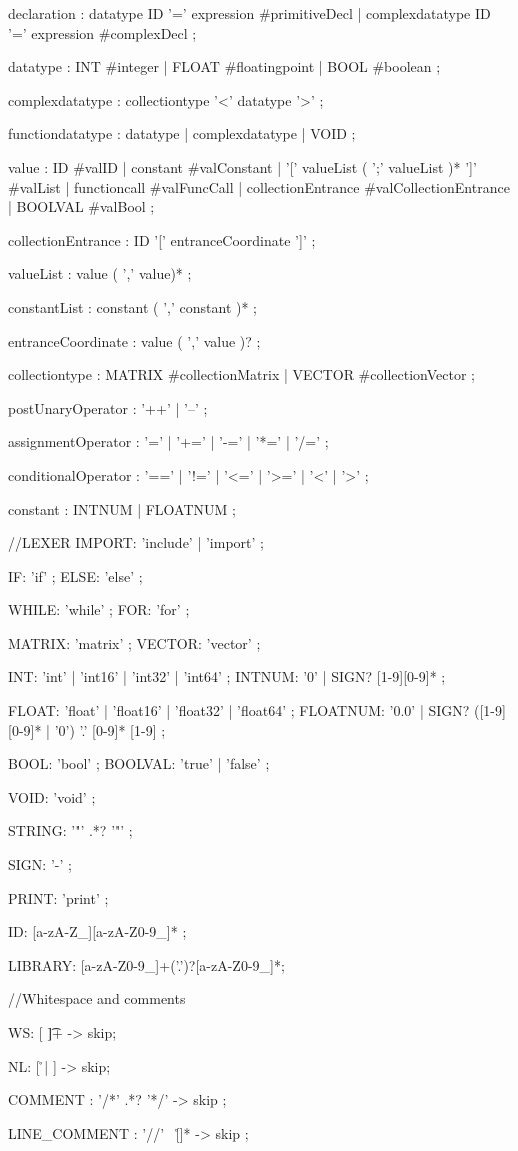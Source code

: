 declaration
    : datatype ID '=' expression                        #primitiveDecl
    | complexdatatype ID '=' expression                 #complexDecl
    ; 
    
datatype
    : INT                               #integer
    | FLOAT                             #floatingpoint
    | BOOL                              #boolean
    ;

complexdatatype
    : collectiontype '<' datatype '>'
    ;

functiondatatype
    : datatype
    | complexdatatype
    | VOID
    ;

value
    : ID                                     #valID
    | constant                               #valConstant
    | '[' valueList ( ';' valueList )* ']'   #valList
    | functioncall                           #valFuncCall
    | collectionEntrance                     #valCollectionEntrance
    | BOOLVAL                                #valBool
    ;

collectionEntrance
    : ID '[' entranceCoordinate ']'
    ;

valueList
    : value ( ',' value)*
    ;

constantList
    : constant ( ',' constant )*
    ;

entranceCoordinate
    : value ( ',' value )?
    ;

collectiontype
    : MATRIX    #collectionMatrix
    | VECTOR    #collectionVector
    ;

postUnaryOperator 
    : '++' | '--'
    ;

assignmentOperator
    : '=' | '+=' | '-=' | '*=' | '/=' ;

conditionalOperator
    : '==' | '!=' | '<=' | '>=' | '<' | '>' ;

constant
    : INTNUM  
    | FLOATNUM 
    ;

//LEXER 
IMPORT: 'include' | 'import' ;  
  
IF: 'if' ;
ELSE: 'else' ;

WHILE: 'while' ;
FOR: 'for' ;

MATRIX: 'matrix' ;
VECTOR: 'vector' ;


INT: 'int' | 'int16' | 'int32' | 'int64' ;
INTNUM: '0' | SIGN? [1-9][0-9]* ;

FLOAT: 'float' | 'float16' | 'float32' | 'float64' ;  
FLOATNUM: '0.0' | SIGN? ([1-9][0-9]* | '0') '.' [0-9]* [1-9] ;

BOOL: 'bool' ;
BOOLVAL: 'true' | 'false' ;

VOID: 'void' ;

STRING: '"' .*? '"' ;

SIGN: '-' ;   

PRINT: 'print' ; 

ID: [a-zA-Z_][a-zA-Z0-9_]* ;    

LIBRARY: [a-zA-Z0-9_\/]+('.')?[a-zA-Z0-9_]*;

//Whitespace and comments

WS: [ \t ]+ -> skip;

NL: [ \r \n | \n ] -> skip;

COMMENT
    :   '/*' .*? '*/' -> skip
    ;

LINE_COMMENT
    :   '//' ~[\r\n]* -> skip
    ;